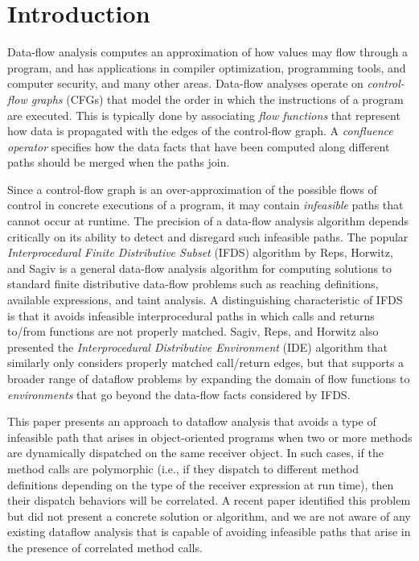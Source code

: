 \section{Introduction}

Data-flow analysis computes an approximation of how values may flow  
through a program, and has applications in compiler optimization, 
programming tools, and computer security, and many other areas.
Data-flow analyses operate on \textit{control-flow graphs} (CFGs)
that model 
the order in which the instructions of a program are executed. This is
typically done by associating \textit{flow functions} that represent how 
data is propagated with the edges of the control-flow graph.  A 
\textit{confluence operator} specifies how the data facts that have been 
computed along different paths should be merged when the paths join.

Since a control-flow graph is an over-approximation of the possible flows 
of control in concrete executions of a program, it may contain \textit{infeasible} 
paths that cannot occur at runtime. The precision of a data-flow analysis algorithm
depends critically on its ability to detect and disregard such infeasible paths.
The popular \textit{Interprocedural Finite Distributive Subset} (IFDS) algorithm 
by  Reps, Horwitz, and Sagiv \cite{reps1995precise} is a general data-flow analysis
algorithm for computing solutions to standard finite distributive data-flow problems such 
as reaching definitions, available expressions, and taint analysis.
A distinguishing 
characteristic of IFDS is that it avoids infeasible interprocedural paths in which calls 
and returns to/from functions are not properly matched. Sagiv, Reps, and Horwitz
also presented the \textit{Interprocedural Distributive Environment} (IDE) algorithm
\cite{sagiv1996precise} that similarly only considers properly matched call/return
edges, but that supports a broader range of dataflow problems by expanding the 
domain of flow functions to \textit{environments} that go beyond the data-flow facts 
considered by IFDS.

This paper presents an approach to dataflow analysis that avoids a type
of infeasible path that arises in object-oriented programs when two or more
methods are dynamically dispatched on the same receiver object. In such cases, if the
method calls are polymorphic (i.e., if they dispatch to different method definitions 
depending on the type of the receiver expression at run time), then their dispatch 
behaviors will be correlated. A recent paper \cite{DBLP:journals/scp/Tip15} identified
this problem but did not present a concrete solution or algorithm, and we are not aware 
of any existing dataflow analysis that is capable of avoiding infeasible paths that arise 
in the presence of correlated method calls.

